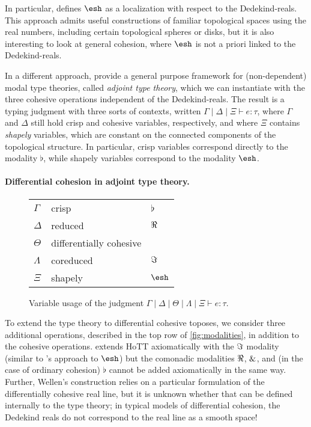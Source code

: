\documentclass{article}
\begin{document}
In particular, \citeauthor{Shulman2015} defines $\shape$ as a localization with
respect to the Dedekind-reals. This approach admits useful constructions of
familiar topological spaces using the real numbers, including certain
topological spheres or disks, but it is also interesting to look at general
cohesion, where $\shape$ is not a priori linked to the Dedekind-reals. 



In a different approach, \citet{Licata2017} provide a general purpose
framework for (non-dependent) modal type theories, called \emph{adjoint type
  theory}, which we can instantiate with the three cohesive operations
independent of the Dedekind-reals. The result is a typing judgment with three
sorts of contexts, written $\Gamma \mid \Delta \mid \Xi \vdash e : \tau$, where
$\Gamma$ and $\Delta$ still hold crisp and cohesive variables, respectively, and
where $\Xi$ contains \emph{shapely} variables, which are constant on the
connected components of the topological structure. In particular, crisp
variables correspond directly to the modality $\flat$, while shapely variables
correspond to the modality $\shape$.


\paragraph{Differential cohesion in adjoint type theory.}

\begin{wrapfigure}{R}{0.31\textwidth}
\vspace{-4mm}
\begin{center} \begin{tabular}{lll}
    $\Gamma$ & crisp  &  $\flat$ \\
    $\Delta$ & reduced & $\Re$ \\
    $\Theta$ & differentially cohesive & \\
    $\Lambda$ & coreduced & $\Im$ \\
    $\Xi$ & shapely & $\shape$
\end{tabular} \end{center}
\caption{Variable usage of the judgment
  $\Gamma \mid \Delta \mid \Theta \mid \Lambda \mid \Xi \vdash e : \tau$.}
\label{fig:contexts}
\end{wrapfigure}

To extend the type theory to differential cohesive toposes, we consider three
additional operations, described in the top row of \cref{fig:modalities}, in
addition to the cohesive operations. \citet{Wellen2017} extends HoTT
axiomatically with the $\Im$ modality (similar to \citeauthor{Shulman2015}'s
approach to $\shape$) but the comonadic modalities $\Re$, $\&$, and (in the
case of ordinary cohesion) $\flat$ cannot be added axiomatically in the same
way. Further, Wellen's construction relies on a particular formulation of the
differentially cohesive real line, but it is unknown whether that can be defined
internally to the type theory; in typical models of differential cohesion, the
Dedekind reals do not correspond to the real line as a smooth space!
\end{document}
